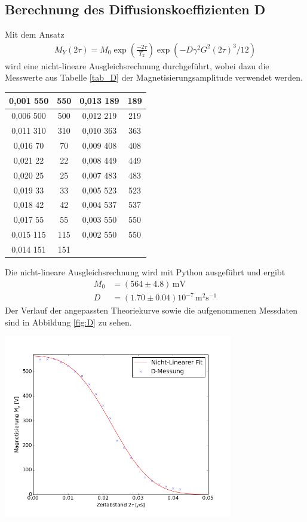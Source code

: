 \documentclass[]{scrartcl}
\begin{document}
\subsection{Berechnung des Diffusionskoeffizienten D}
Mit dem Ansatz
\begin{align*}
M_Y(2\tau)=M_0\exp\left( \frac{-2\tau}{T_2}\right) \exp(-D\gamma^2G^2(2\tau)^3/12)
\end{align*}
wird eine nicht-lineare Ausgleichsrechnung durchgeführt, wobei dazu die Messwerte aus Tabelle \ref{tab_D} der Magnetisierungsamplitude verwendet werden. \\
\begin{center}
	\begin{tabular}{|c|c|c|c|}
		\hline	0,001	550	&	550	&	0,013	189	&	189	\\
		\hline	0,006	500	&	500	&	0,012	219	&	219	\\
		\hline	0,011	310	&	310	&	0,010	363	&	363	\\
		\hline	0,016	70	&	70	&	0,009	408	&	408	\\
		\hline	0,021	22	&	22	&	0,008	449	&	449	\\
		\hline	0,020	25	&	25	&	0,007	483	&	483	\\
		\hline	0,019	33	&	33	&	0,005	523	&	523	\\
		\hline	0,018	42	&	42	&	0,004	537	&	537	\\
		\hline	0,017	55	&	55	&	0,003	550	&	550	\\
		\hline	0,015	115	&	115	&	0,002	550	&	550	\\
		\hline	0,014	151	&	151	&		&		\\
	\end{tabular}
	\label{tab_D}
\end{center}
Die nicht-lineare Ausgleichsrechnung wird mit Python ausgeführt und ergibt 
\begin{align*}
M_0&=(564 \pm 4.8)\,\text{mV}\\
D&=(1.70 \pm 0.04) 10^{-7}\,\text{m$^2$s$^{-1}$}
\end{align*}
Der Verlauf der angepassten Theoriekurve sowie die aufgenommenen Messdaten sind in Abbildung \ref{fig:D} zu sehen.
\begin{center}
	\includegraphics[width=10cm]{images/plotD.png}
	\label{fig:D}
\end{center}
\end{document}
